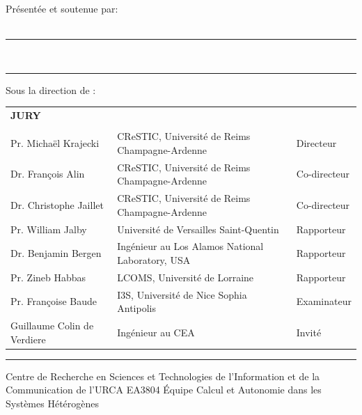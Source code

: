 \documentclass[12pt,a4paper]{report}
\begin{document}
{%
{
	\vspace{1cm}
	Pr\'esent\'ee et soutenue par:\\
	\vspace{.4cm}
	\Large
	\textbf{\phdAuthor}\\
	\vspace{.4cm}
	\large
	\vspace{.5cm}	
}

{
	\hrule height 2pt
	\vspace{2pt}
	\Large 
	\vspace{1cm}
	\phdTitleFR\\
	\large
	\vspace{1.0cm}
	\hrule
	\vspace{1cm}
}

{
	Sous la direction de :\\ 
	\textbf{\phdDirector}
	\vspace{0.5cm}
	\vspace{\fill}
}

{
\normalsize
\begin{tabular}{l l l}
		\textbf{JURY} &  & \\
		&&\\
		Pr. Michaël Krajecki & CReSTIC, Université de Reims Champagne-Ardenne & Directeur \\
		Dr. François Alin & CReSTIC, Université de Reims Champagne-Ardenne & Co-directeur  \\
		Dr. Christophe Jaillet & CReSTIC, Université de Reims Champagne-Ardenne & Co-directeur \\
		Pr. William Jalby & Université de Versailles Saint-Quentin & Rapporteur\\
		Dr. Benjamin Bergen & Ingénieur au Los Alamos National Laboratory, USA & Rapporteur \\
		Pr. Zineb Habbas & LCOMS, Université de Lorraine & Rapporteur \\ 
		Pr. Françoise Baude & I3S, Université de Nice Sophia Antipolis& Examinateur\\
		Guillaume Colin de Verdiere & Ingénieur au CEA & Invit\'e
\end{tabular}
\vspace{0.5cm}
\hrule
\vspace{0.3cm}
}

{
	Centre de Recherche en Sciences et Technologies de l'Information et de la Communication de l'URCA EA3804
}
{
	\'Equipe Calcul et Autonomie dans les Systèmes Hétérogènes
}

}
\end{document}
